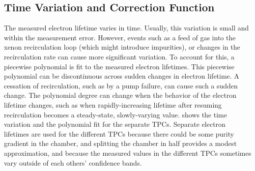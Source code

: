 \documentclass[herrin-thesis.tex]{subfiles}
\begin{document}
\subsection{Time Variation and Correction Function}

The measured electron lifetime varies in time. Usually, this variation is small and within the measurement error. However, events such as a feed of gas into the xenon recirculation loop (which might introduce impurities), or changes in the recirculation rate can cause more significant variation. To account for this, a piecewise polynomial is fit to the measured electron lifetimes. This piecewise polynomial can be discontinuous across sudden changes in electron lifetime. A cessation of recirculation, such as by a pump failure, can cause such a sudden change. The polynomial degree can change when the behavior of the electron lifetime changes, such as when rapidly-increasing lifetime after resuming recirculation becomes a steady-state, slowly-varying value.  shows the time variation and the polynomial fit for the separate TPCs. Separate electron lifetimes are used for the different TPCs because there could be some purity gradient in the chamber, and splitting the chamber in half provides a modest approximation, and because the measured values in the different TPCs sometimes vary outside of each others' confidence bands.
\end{document}
